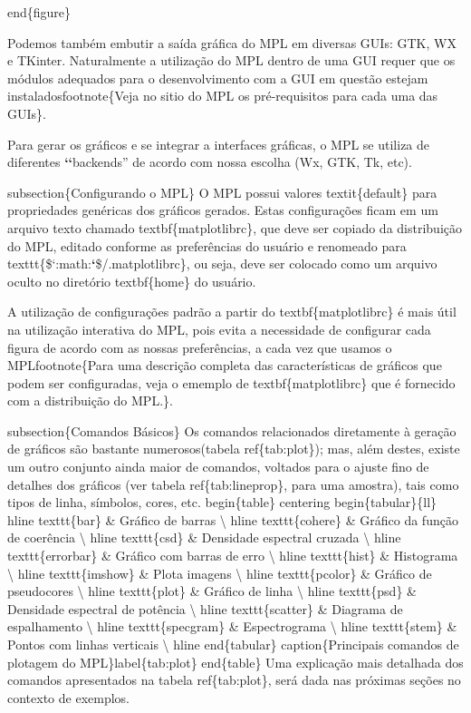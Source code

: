 \documentclass[a4paper,10pt,portuguese]{sphinxmanual}
\begin{document}
end\{figure\}

Podemos também embutir a saída gráfica do MPL em diversas GUIs: GTK, WX e TKinter. Naturalmente a utilização do MPL dentro de uma GUI requer que os módulos adequados para o desenvolvimento com a GUI em questão estejam instaladosfootnote\{Veja no sitio do MPL os pré-requisitos para cada uma das GUIs\}.

Para gerar os gráficos e se integrar a interfaces gráficas, o MPL se utiliza de diferentes {\color{red}\bfseries{}{}`{}`}backends'' de acordo com nossa escolha (Wx, GTK, Tk, etc).

subsection\{Configurando o MPL\}
O MPL possui valores textit\{default\} para propriedades genéricas dos gráficos gerados. Estas configurações ficam em um arquivo texto chamado textbf\{matplotlibrc\}, que deve ser copiado da distribuição do MPL, editado conforme as preferências do usuário e renomeado para texttt\{\${}`:math:{\color{red}\bfseries{}{}`}\$/.matplotlibrc\}, ou seja, deve ser colocado como um arquivo oculto no diretório textbf\{home\} do usuário.

A utilização de configurações padrão a partir do textbf\{matplotlibrc\} é mais útil na utilização interativa do MPL, pois evita a necessidade de configurar cada figura de acordo com as nossas preferências, a cada vez que usamos o MPLfootnote\{Para uma descrição completa das características de gráficos que podem ser configuradas, veja o ememplo de textbf\{matplotlibrc\} que é fornecido com a distribuição do MPL.\}.

subsection\{Comandos Básicos\}
Os comandos relacionados diretamente à geração de gráficos são bastante numerosos(tabela ref\{tab:plot\}); mas, além  destes, existe um outro conjunto ainda maior de comandos, voltados para o ajuste fino de detalhes dos gráficos (ver tabela ref\{tab:lineprop\}, para uma amostra), tais como tipos de linha, símbolos, cores, etc.
begin\{table\}
centering
begin\{tabular\}\{l\textbar{}l\}
hline texttt\{bar\} \& Gráfico de barras \textbackslash{}
hline texttt\{cohere\} \& Gráfico da função de coerência \textbackslash{}
hline texttt\{csd\} \& Densidade espectral cruzada \textbackslash{}
hline texttt\{errorbar\} \& Gráfico com barras de erro \textbackslash{}
hline texttt\{hist\} \& Histograma \textbackslash{}
hline texttt\{imshow\} \& Plota imagens \textbackslash{}
hline texttt\{pcolor\} \& Gráfico de pseudocores \textbackslash{}
hline texttt\{plot\} \& Gráfico de linha \textbackslash{}
hline texttt\{psd\} \& Densidade espectral de potência \textbackslash{}
hline texttt\{scatter\} \& Diagrama de espalhamento \textbackslash{}
hline texttt\{specgram\} \& Espectrograma \textbackslash{}
hline texttt\{stem\} \& Pontos com linhas verticais \textbackslash{}
hline
end\{tabular\}
caption\{Principais comandos de plotagem do MPL\}label\{tab:plot\}
end\{table\}
Uma explicação mais detalhada dos comandos apresentados na tabela ref\{tab:plot\}, será dada nas próximas seções no contexto de exemplos.
\end{document}
